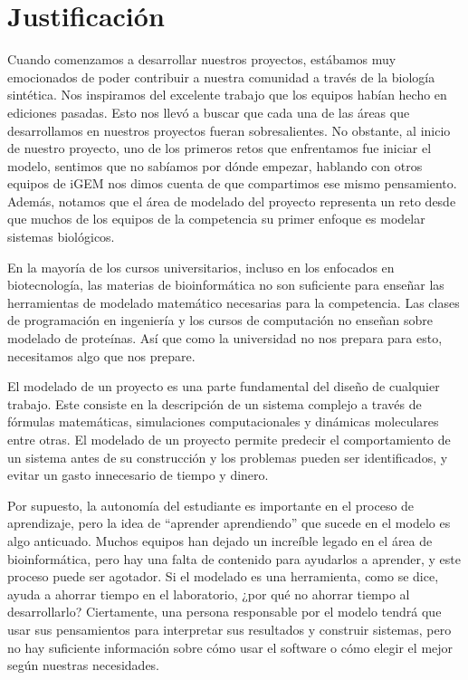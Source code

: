 \documentclass[11pt, letterpaper, spanish]{article}
\begin{document}
\section{Justificación}
\par{Cuando comenzamos a desarrollar nuestros proyectos, estábamos muy emocionados de poder contribuir a nuestra comunidad a través de la biología sintética. Nos inspiramos del excelente trabajo que los equipos habían hecho en ediciones pasadas. Esto nos llevó a buscar que cada una de las áreas que desarrollamos en nuestros proyectos fueran sobresalientes. No obstante, al inicio de nuestro proyecto, uno de los primeros retos que enfrentamos fue iniciar el modelo, sentimos que no sabíamos por dónde empezar, hablando con otros equipos de iGEM nos dimos cuenta de que compartimos ese mismo pensamiento. Además, notamos que el área de modelado del proyecto representa un reto desde que muchos de los equipos de la competencia su primer enfoque es modelar sistemas biológicos. }
\par{En la mayoría de los cursos universitarios, incluso en los enfocados en biotecnología, las materias de bioinformática no son suficiente para enseñar las herramientas de modelado matemático necesarias para la competencia. Las clases de programación en ingeniería y los cursos de computación no enseñan sobre modelado de proteínas. Así que como la universidad no nos prepara para esto, necesitamos algo que nos prepare.}
\par{El modelado de un proyecto es una parte fundamental del diseño de cualquier trabajo. Este consiste en la descripción de un sistema complejo a través de fórmulas matemáticas, simulaciones computacionales y dinámicas moleculares entre otras. El modelado de un proyecto permite predecir el comportamiento de un sistema antes de su construcción y los problemas pueden ser identificados, y evitar un gasto innecesario de tiempo y dinero.}
\par{Por supuesto, la autonomía del estudiante es importante en el proceso de aprendizaje, pero la idea de “aprender aprendiendo” que sucede en el modelo es algo anticuado. Muchos equipos han dejado un increíble legado en el área de bioinformática, pero hay una falta de contenido para ayudarlos a aprender, y este proceso puede ser agotador. Si el modelado es una herramienta, como se dice, ayuda a ahorrar tiempo en el laboratorio, ¿por qué no ahorrar tiempo al desarrollarlo? Ciertamente, una persona responsable por el modelo tendrá que usar sus pensamientos para interpretar sus resultados y construir sistemas, pero no hay suficiente información sobre cómo usar el software o cómo elegir el mejor según nuestras necesidades.}
\end{document}
